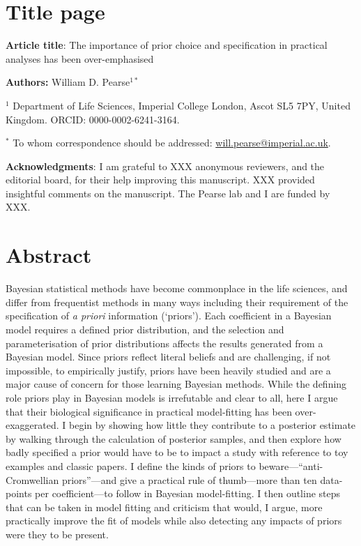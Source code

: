 \documentclass[12pt]{report}
\begin{document}
\section*{Title page}
\textbf{Article title}: The importance of prior choice and specification in practical analyses has been over-emphasised

\textbf{Authors:} William D. Pearse$^{1*}$

$^1$ Department of Life Sciences, Imperial College London, Ascot SL5 7PY, United Kingdom. ORCID: 0000-0002-6241-3164.

$^*$ To whom correspondence should be addressed: \url{will.pearse@imperial.ac.uk}.

\textbf{Acknowledgments}: I am grateful to XXX anonymous reviewers, and the editorial board, for their help improving this manuscript. XXX provided insightful comments on the manuscript. The Pearse lab and I are funded by XXX.

\newpage
\section{Abstract}
Bayesian statistical methods have become commonplace in the life sciences, and differ from frequentist methods in many ways including their requirement of the specification of \emph{a priori} information (`priors'). Each coefficient in a Bayesian model requires a defined prior distribution, and the selection and parameterisation of prior distributions affects the results generated from a Bayesian model. Since priors reflect literal beliefs and are challenging, if not impossible, to empirically justify, priors have been heavily studied and are a major cause of concern for those learning Bayesian methods. While the defining role priors play in Bayesian models is irrefutable and clear to all, here I argue that their biological significance in practical model-fitting has been over-exaggerated. I begin by showing how little they contribute to a posterior estimate by walking through the calculation of posterior samples, and then explore how badly specified a prior would have to be to impact a study with reference to toy examples and classic papers. I define the kinds of priors to beware---``anti-Cromwellian priors''---and give a practical rule of thumb---more than ten data-points per coefficient---to follow in Bayesian model-fitting. I then outline steps that can be taken in model fitting and criticism that would, I argue, more practically improve the fit of models while also detecting any impacts of priors were they to be present.
\end{document}
